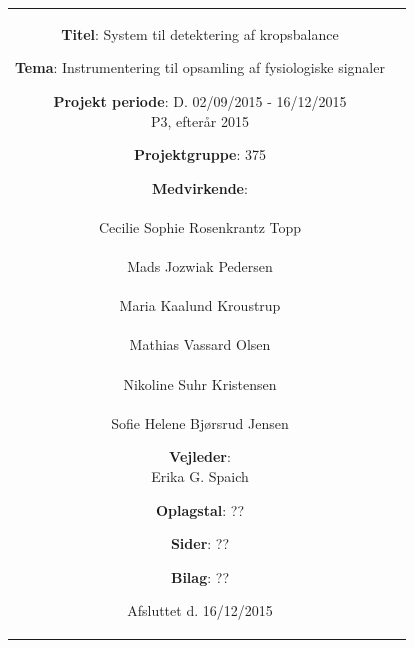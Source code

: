 \begin{nopagebreak}
{\begin{tabular}{cc}
\parbox{7cm}{
\begin{description}
{\setlength{\parindent}{0cm}
\item \textbf{Titel}: System til detektering af kropsbalance \\
\item \textbf{Tema}: Instrumentering til opsamling af fysiologiske signaler\\
\item \textbf{Projekt periode}: D. 02/09/2015 - 16/12/2015\\
   P3, efterår 2015\\
  \hspace{4cm}
\item \textbf{Projektgruppe}: 375 \\
  \hspace{4cm}
\item \textbf{Medvirkende}:\\
\underline{\hspace{4cm}}\\
Cecilie Sophie Rosenkrantz Topp  \\
\underline{\hspace{4cm}}\\
Mads Jozwiak Pedersen \\
\underline{\hspace{4cm}}\\
Maria Kaalund Kroustrup \\
\underline{\hspace{4cm}}\\
Mathias Vassard Olsen \\
\underline{\hspace{4cm}}\\
Nikoline Suhr Kristensen \\
\underline{\hspace{4cm}}\\
Sofie Helene Bjørsrud Jensen \\
\hspace{1cm}
\item \textbf{Vejleder}:\\
Erika G. Spaich  \\
}
  
\end{description}

\begin{description}
\item {\textbf{Oplagstal}: ??}
\item \textbf{Sider}: ?? 
\item \textbf{Bilag}: ??
\item {Afsluttet d. 16/12/2015} 
\end{description}

}
\end{tabular}}
\end{nopagebreak}
